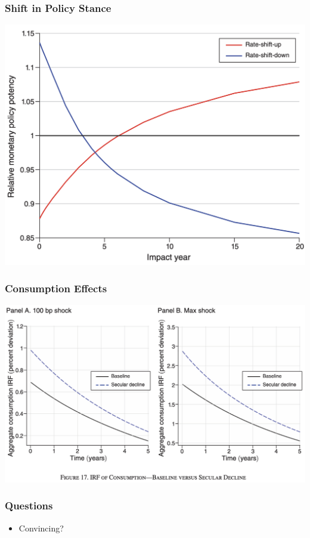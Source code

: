 \documentclass[english,xcolor=svgnames]{beamer}
\begin{document}
\begin{frame}
    \frametitle{Shift in Policy Stance}
    \begin{center}
    	\includegraphics[scale=0.3]{figures/BMTVFIG14.png}	
    \end{center}
\end{frame}

\begin{frame}
    \frametitle{Consumption Effects}
    \begin{center}
    	\includegraphics[scale=0.3]{figures/BMTVFIG17.png}	
    \end{center}
\end{frame}

\begin{frame}
    \frametitle{Questions}
	\begin{itemize}
		\item Convincing?
	\end{itemize}
\end{frame}
\end{document}
